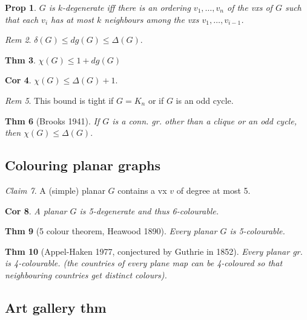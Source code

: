 \documentclass[11pt, fleqn, a4paper, landscape]{article}
\theoremstyle{plain} %
\newtheorem{thm}{Thm}
\newtheorem{pro}[thm]{Prop}
\newtheorem{cor}[thm]{Cor}
\theoremstyle{remark} %
\newtheorem{rem}[thm]{Rem}
\newtheorem{claim}[thm]{Claim}
\theoremstyle{definition} %
\newtheorem{defi}[thm]{Def}
\begin{document}
\begin{multicols}{5}
\begin{pro}
$G$ is $k$-degenerate iff there is an ordering $v_1, \dots , v_n$ of the vxs of $G$ such that each $v_i$ has at most $k$ neighbours among the vxs $v_1, \dots , v_{i-1}$.
\end{pro}

\addtocounter{thm}{1}
\begin{rem}
$\delta(G) \le dg(G) \le \Delta(G)$.
\end{rem}

\begin{thm}
$\chi(G) \le 1 + dg(G)$
\end{thm}

\begin{cor}
$\chi(G) \le \Delta(G) + 1.$
\end{cor}

\begin{rem}
This bound is tight if $G = K_n$ or if $G$ is an odd cycle.
\end{rem}

\begin{thm}[Brooks 1941]
If $G$ is a conn. gr. other than a clique or an odd cycle, then
$\chi(G) \le \Delta(G).$
\end{thm}

\subsection{Colouring planar graphs}
\begin{claim}
A (simple) planar $G$ contains a vx $v$ of degree at most 5.
\end{claim}

\begin{cor}
A planar $G$ is 5-degenerate and thus 6-colourable.
\end{cor}
\begin{thm}[5 colour theorem, Heawood 1890]
Every planar $G$ is 5-colourable.
\end{thm}

\begin{thm}[Appel-Haken 1977, conjectured by Guthrie in 1852]
Every planar gr. is 4-colourable. (the countries of every plane map can be 4-coloured so that neighbouring countries get
distinct colours).
\end{thm}
\addtocounter{thm}{1}
\subsection{Art gallery thm}


\end{multicols}
\end{document}
